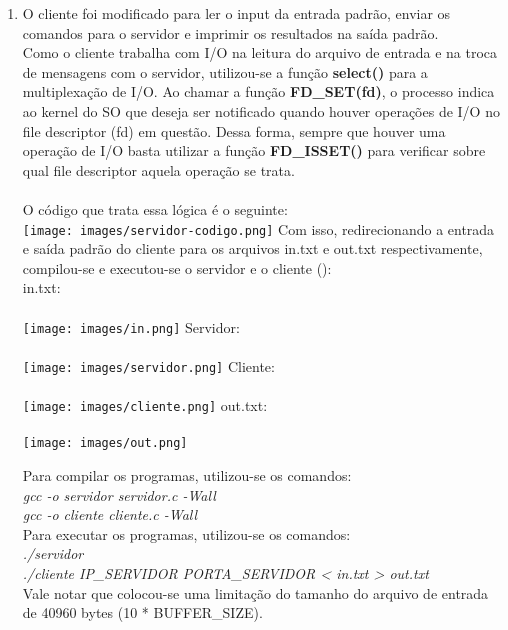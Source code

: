 \documentclass[12pt,a4paper]{report}
\begin{document}
\begin{enumerate}
    \item O cliente foi modificado para ler o input da entrada padrão, enviar os comandos para o servidor e imprimir os resultados na saída padrão. 
    \\
    Como o cliente trabalha com I/O na leitura do arquivo de entrada e na troca de mensagens com o servidor, utilizou-se a função \textbf{select()} para a multiplexação de I/O. Ao chamar a função \textbf{FD\_SET(fd)}, o processo indica ao kernel do SO que deseja ser notificado quando houver operações de I/O no file descriptor (fd) em questão. Dessa forma, sempre que houver uma operação de I/O basta utilizar a função \textbf{FD\_ISSET()} para verificar sobre qual file descriptor aquela operação se trata. 
    \\\\
    O código que trata essa lógica é o seguinte:
    \\
    \texttt{[image: images/servidor-codigo.png]}
    Com isso, redirecionando a entrada e saída padrão do cliente para os arquivos in.txt e out.txt respectivamente, compilou-se e executou-se o servidor e o cliente ():
    \\
    in.txt:\\\\
    \texttt{[image: images/in.png]}
    Servidor:\\\\
    \texttt{[image: images/servidor.png]}
    Cliente:\\\\
    \texttt{[image: images/cliente.png]}
    out.txt:\\\\
    \texttt{[image: images/out.png]}
    
    Para compilar os programas, utilizou-se os comandos:\\
    \textit{gcc -o servidor servidor.c -Wall}\\
    \textit{gcc -o cliente cliente.c -Wall}\\
    
    Para executar os programas, utilizou-se os comandos:\\
    \textit{./servidor}\\
    \textit{./cliente IP\_SERVIDOR PORTA\_SERVIDOR < in.txt > out.txt}\\
    
    Vale notar que colocou-se uma limitação do tamanho do arquivo de entrada de 40960 bytes (10 * BUFFER\_SIZE).
    

\end{enumerate}
\end{document}
